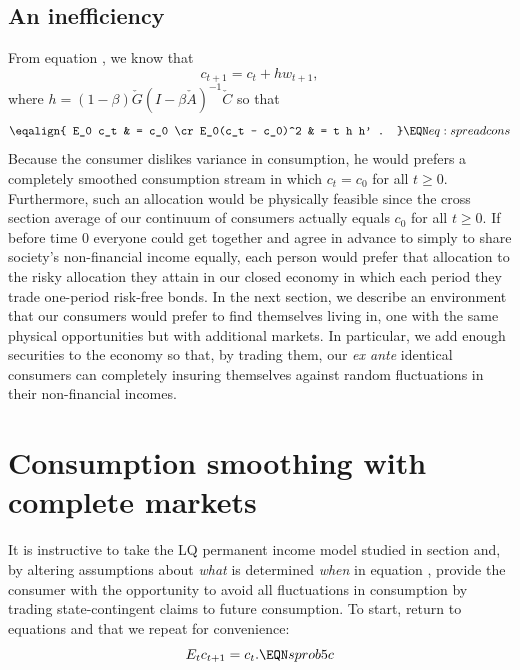 \subsection{An inefficiency}
 From equation , we know that  
$$ c_{t+1} = c_t + h w_{t+1} , $$
where $h = (1-\beta) \check G (I - \beta \check A)^{-1} \check C $
so that
$$ \eqalign{ E_0 c_t & = c_0 \cr
              E_0(c_t  - c_0)^2 & = t h h' . } \EQN eq:spreadcons $$
Because the consumer dislikes variance in consumption, he would prefers a completely smoothed   consumption stream  in which $c_t = c_0$ for all $t \geq 0$. Furthermore, such an allocation 
would be physically feasible since the cross section average of our continuum of consumers actually equals $c_0$ for all $t \geq 0$.  If before time $0$ everyone could get together and agree in advance to 
simply to share society's non-financial income equally, each person would prefer that allocation to the 
risky allocation they attain in our closed economy in which each period they trade one-period risk-free bonds.   In the next section, we describe an environment that our consumers would prefer to find themselves living in, one  with the same physical opportunities but with additional markets.  In particular, we add enough securities to the economy so that, by trading them, our {\it ex ante} identical consumers can  completely insuring themselves against random fluctuations in their
non-financial incomes. 






%
%
\section{Consumption smoothing with complete markets}\label{sec:LQcomplete}%
It is instructive to take  the LQ permanent income model studied in section  and, by altering assumptions
about {\it what\/} is determined {\it when\/} in equation  ,  provide the consumer with  the opportunity
to avoid all fluctuations in consumption by trading state-contingent claims to future consumption.
To start,   return to   equations   and  that   we repeat for convenience:
$$ E_t c_{t+1} = c_t . \EQN sprob5c $$

